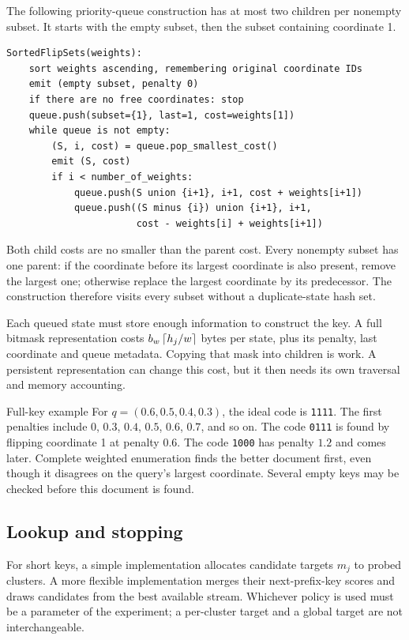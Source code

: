 The following priority-queue construction has at most two children per nonempty subset.
It starts with the empty subset, then the subset containing coordinate 1.
\par\noindent\begin{minipage}{\linewidth}
\begin{lstlisting}[caption={A complete sorted-subset stream, not one chain of flips.}]
SortedFlipSets(weights):
    sort weights ascending, remembering original coordinate IDs
    emit (empty subset, penalty 0)
    if there are no free coordinates: stop
    queue.push(subset={1}, last=1, cost=weights[1])
    while queue is not empty:
        (S, i, cost) = queue.pop_smallest_cost()
        emit (S, cost)
        if i < number_of_weights:
            queue.push(S union {i+1}, i+1, cost + weights[i+1])
            queue.push((S minus {i}) union {i+1}, i+1,
                       cost - weights[i] + weights[i+1])
\end{lstlisting}
\end{minipage}\par

Both child costs are no smaller than the parent cost. Every nonempty subset has one parent:
if the coordinate before its largest coordinate is also present, remove the largest one;
otherwise replace the largest coordinate by its predecessor. The construction therefore
visits every subset without a duplicate-state hash set.

Each queued state must store enough information to construct the key. A full bitmask representation costs
$b_w\left\lceil h_j/w\right\rceil$ bytes per state, plus its penalty, last coordinate and queue metadata.
Copying that mask into children is work. A persistent representation can change this cost,
but it then needs its own traversal and memory accounting.

\begin{examplebox}{Full-key example}
For $q=(0.6,0.5,0.4,0.3)$, the ideal code is \texttt{1111}. The first penalties include
$0$, $0.3$, $0.4$, $0.5$, $0.6$, $0.7$, and so on. The code \texttt{0111} is found by flipping
coordinate 1 at penalty $0.6$. The code \texttt{1000} has penalty $1.2$ and comes later.
Complete weighted enumeration finds the better document first, even though it disagrees on
the query's largest coordinate. Several empty keys may be checked before this document is found.
\end{examplebox}

\subsection{Lookup and stopping}
For short keys, a simple implementation allocates candidate targets $m_j$ to probed clusters.
A more flexible implementation merges their next-prefix-key scores and draws candidates from
the best available stream. Whichever policy is used must be a parameter of the experiment;
a per-cluster target and a global target are not interchangeable.

